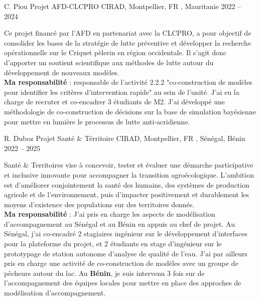 

\begin{cventries}

\cventry
{C. Piou} %
{Projet AFD-CLCPRO} %
{CIRAD, Montpellier, FR \hspace{5em}, Mauritanie} %
{2022 -- 2024} %
{
  \begin{cvitems} %
    Ce projet financé par l'AFD en partenariat avec la CLCPRO, a pour objectif de consolider les bases de la stratégie de lutte préventive et développer la recherche opérationnelle sur le Criquet pèlerin en région occidentale. Il s'agit donc d'apporter un soutient scientifique aux méthodes de lutte autour du développement de nouveaux modèles.\\
    \textbf{Ma responsabilité } : responsable de l'activité 2.2.2 "co-construction de modèles pour identifier les critères d’intervention rapide" au sein de l'unité. J'ai eu la charge de recruter et co-encadrer 3 étudiants de M2. J'ai développé une méthodologie de co-construction de décisions sur la base de simulation bayésienne pour mettre en lumière le processus de lutte anti-acridienne.
  \end{cvitems}
}

\cventry
{R. Duboz} %
{Projet Santé \& Térritoire} %
{CIRAD, Montpellier, FR \hspace{5em}, Sénégal, Bénin} %
{2022 -- 2025} %
{
  \begin{cvitems} %
    Santé & Territoires vise à concevoir, tester et évaluer une démarche participative et inclusive innovante pour accompagner la transition agroécologique. L’ambition est d’améliorer conjointement la santé des humains, des systèmes de production agricole et de l’environnement, puis d’impacter positivement et durablement les moyens d’existence des populations sur des territoires donnés.\\
    \textbf{Ma responsabilité } : J'ai pris en charge les aspects de modélisation d'accompagnement au Sénégal et au Bénin en appuis au chef de projet. Au Sénégal, j'ai co-encadré 2 stagiaires ingénieur sur le développement d'interfaces pour la plateforme du projet, et 2 étudiants en stage d'ingénieur sur le prototypage de station autonome d'analyse de qualité de l'eau. J'ai par ailleurs pris en charge une activité de co-construction de modèles avec un groupe de pêcheurs autour du lac. Au \textbf{Bénin}, je suis intervenu 3 fois sur de l'accompagnement des équipes locales pour mettre en place des approches de modélisation d'accompagnement.
  \end{cvitems}
}


\end{cventries}
